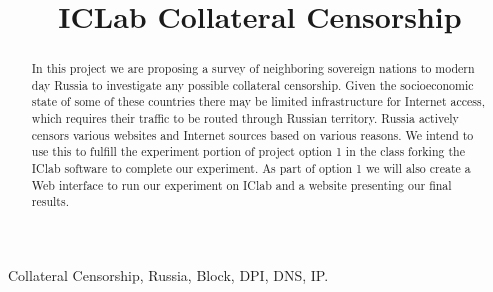 \documentclass[conference]{IEEEtran}
\begin{document}
%
\title{ICLab Collateral Censorship}


\author{
\and
{}
\and
{}
}

\maketitle


\begin{abstract}
In this project we are proposing a survey of neighboring sovereign nations to modern day Russia to investigate any possible collateral censorship.
Given the socioeconomic state of some of these countries there may be limited infrastructure for Internet access, which requires their traffic to be routed through Russian territory.
Russia actively censors various websites and Internet sources based on various reasons.
We intend to use this to fulfill the experiment portion of project option 1 in the class forking the IClab software to complete our experiment. 
As part of option 1 we will also create a Web interface to run our experiment on IClab and a website presenting our final results.

\end{abstract}

\begin{IEEEkeywords}
Collateral Censorship, Russia, Block, DPI, DNS, IP.
\end{IEEEkeywords}

\IEEEpeerreviewmaketitle
\end{document}
